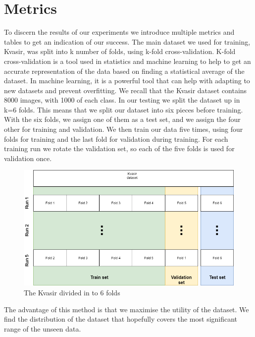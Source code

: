 \section{Metrics}
To discern the results of our experiments we introduce multiple metrics and tables to get an indication of our success. 
The main dataset we used for training, Kvasir, was split into k number of folds, using k-fold cross-validation. 
K-fold cross-validation is a tool used in statistics and machine learning to help to get an accurate representation of the data based on finding a statistical average of the dataset.  In machine learning, it is a powerful tool that can help with adapting to new datasets and prevent overfitting. 
We recall that the Kvasir dataset contains 8000 images, with 1000 of each class. 
In our testing we split the dataset up in k=6 folds. This means that we split our dataset into six pieces before training.  With the six folds, we assign one of them as a test set, and we assign the four other for training and validation. We then train our data five times, using four folds for training and the last fold for validation during training. For each training run we rotate the validation set, so each of the five folds is used for validation once. 

\begin{figure}[h]
\hspace*{-1cm}                                                           
\centering
\includegraphics[scale=0.4]{experiments/figures/KfoldKvasir_compressed.png}
\caption{The Kvasir divided in to 6 folds}
\label{fig:KfoldKvasir}
\end{figure}

The advantage of this method is that we maximise the utility of the dataset. We find the distribution of the dataset that hopefully covers the most significant range of the unseen data. 

